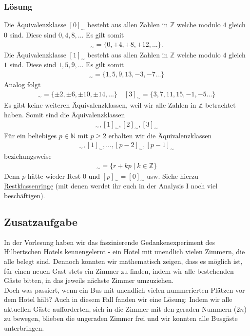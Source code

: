 \documentclass[a4paper,10pt]{article}
\newcommand{\N}{\mathbb{N}}
\newcommand{\Z}{\mathbb{Z}}
\newcommand{\s}[1]{#1}
\begin{document}
\s{\subsubsection*{Lösung}
Die Äquivalenzklasse $[0]_\sim$ besteht aus allen Zahlen in $\Z$ welche modulo $4$ gleich $0$ sind. Diese sind $0,4,8,...$ Es gilt somit
\begin{align*}
    [0]_\sim = \{0,\pm 4,\pm 8,\pm 12,...\}.
\end{align*}
Die Äquivalenzklasse $[1]_\sim$ besteht aus allen Zahlen in $\Z$ welche modulo $4$ gleich $1$ sind. Diese sind $1,5,9,...$ Es gilt somit
\begin{align*}
    [1]_\sim = \{1,5,9,13,-3,-7...\}
\end{align*}
Analog folgt
\begin{align*}
    [2]_\sim = \{ \pm 2, \pm 6, \pm 10, \pm 14,...\}\quad [3]_\sim = \{ 3, 7, 11, 15, -1,-5...\}
\end{align*}
Es gibt keine weiteren Äquivalenzklassen, weil wir alle Zahlen in $\Z$ betrachtet haben. Somit sind die Äquivalenzklassen
\begin{align*}
    [0]_\sim,[1]_\sim,[2]_\sim,[3]_\sim
\end{align*}
Für ein beliebiges $p\in\N$ mit $p\geq 2$ erhalten wir die Äquivalenzklassen
\begin{align*}
    [0]_\sim,[1]_\sim,\hdots ,[p-2]_\sim,[p-1]_\sim
\end{align*}
beziehungsweise
\begin{align*}
    [r]_\sim = \{r+kp\mid k\in \Z\}
\end{align*}
Denn $p$ hätte wieder Rest $0$ und $[p]_\sim = [0]_\sim$ usw. Siehe hierzu \href{https://de.wikipedia.org/wiki/Restklassenring}{Restklassenringe} (mit denen werdet ihr euch in der Analysis I noch viel beschäftigen).
}

\subsection*{Zusatzaufgabe}
In der Vorlesung haben wir das faszinierende Gedankenexperiment des Hilbertschen Hotels kennengelernt - ein Hotel mit unendlich vielen Zimmern, die alle belegt sind. Dennoch konnten wir mathematisch zeigen, dass es möglich ist, für einen neuen Gast stets ein Zimmer zu finden, indem wir alle bestehenden Gäste bitten, in das jeweils nächste Zimmer umzuziehen.\\

Doch was passiert, wenn ein Bus mit unendlich vielen nummerierten Plätzen vor dem Hotel hält? Auch in diesem Fall fanden wir eine Lösung: Indem wir alle aktuellen Gäste aufforderten, sich in die Zimmer mit den geraden Nummern ($2n$) zu bewegen, blieben die ungeraden Zimmer frei und wir konnten alle Busgäste unterbringen.\\
\end{document}
